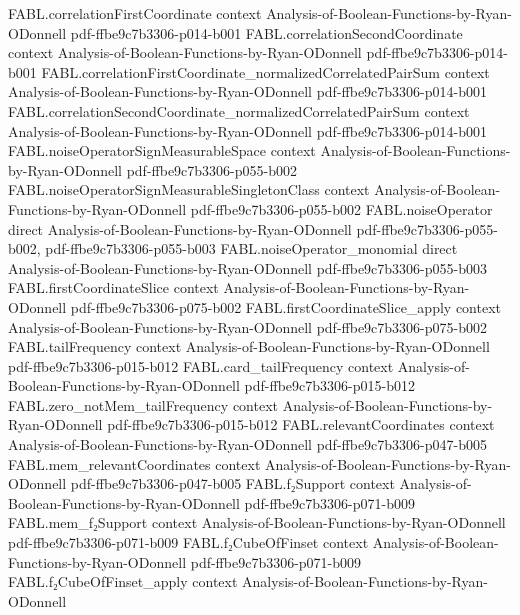 \begin{theorem}
  {FABL.correlationFirstCoordinate}
  {context}
  {Analysis-of-Boolean-Functions-by-Ryan-ODonnell}
  {pdf-ffbe9c7b3306-p014-b001}
\proofstep
  {FABL.correlationSecondCoordinate}
  {context}
  {Analysis-of-Boolean-Functions-by-Ryan-ODonnell}
  {pdf-ffbe9c7b3306-p014-b001}
\proofstep
  {FABL.correlationFirstCoordinate_normalizedCorrelatedPairSum}
  {context}
  {Analysis-of-Boolean-Functions-by-Ryan-ODonnell}
  {pdf-ffbe9c7b3306-p014-b001}
\proofstep
  {FABL.correlationSecondCoordinate_normalizedCorrelatedPairSum}
  {context}
  {Analysis-of-Boolean-Functions-by-Ryan-ODonnell}
  {pdf-ffbe9c7b3306-p014-b001}
\proofstep
  {FABL.noiseOperatorSignMeasurableSpace}
  {context}
  {Analysis-of-Boolean-Functions-by-Ryan-ODonnell}
  {pdf-ffbe9c7b3306-p055-b002}
\proofstep
  {FABL.noiseOperatorSignMeasurableSingletonClass}
  {context}
  {Analysis-of-Boolean-Functions-by-Ryan-ODonnell}
  {pdf-ffbe9c7b3306-p055-b002}
\proofstep
  {FABL.noiseOperator}
  {direct}
  {Analysis-of-Boolean-Functions-by-Ryan-ODonnell}
  {pdf-ffbe9c7b3306-p055-b002,
    pdf-ffbe9c7b3306-p055-b003}
\proofstep
  {FABL.noiseOperator_monomial}
  {direct}
  {Analysis-of-Boolean-Functions-by-Ryan-ODonnell}
  {pdf-ffbe9c7b3306-p055-b003}
\proofstep
  {FABL.firstCoordinateSlice}
  {context}
  {Analysis-of-Boolean-Functions-by-Ryan-ODonnell}
  {pdf-ffbe9c7b3306-p075-b002}
\proofstep
  {FABL.firstCoordinateSlice_apply}
  {context}
  {Analysis-of-Boolean-Functions-by-Ryan-ODonnell}
  {pdf-ffbe9c7b3306-p075-b002}
\proofstep
  {FABL.tailFrequency}
  {context}
  {Analysis-of-Boolean-Functions-by-Ryan-ODonnell}
  {pdf-ffbe9c7b3306-p015-b012}
\proofstep
  {FABL.card_tailFrequency}
  {context}
  {Analysis-of-Boolean-Functions-by-Ryan-ODonnell}
  {pdf-ffbe9c7b3306-p015-b012}
\proofstep
  {FABL.zero_notMem_tailFrequency}
  {context}
  {Analysis-of-Boolean-Functions-by-Ryan-ODonnell}
  {pdf-ffbe9c7b3306-p015-b012}
\proofstep
  {FABL.relevantCoordinates}
  {context}
  {Analysis-of-Boolean-Functions-by-Ryan-ODonnell}
  {pdf-ffbe9c7b3306-p047-b005}
\proofstep
  {FABL.mem_relevantCoordinates}
  {context}
  {Analysis-of-Boolean-Functions-by-Ryan-ODonnell}
  {pdf-ffbe9c7b3306-p047-b005}
\proofstep
  {FABL.f₂Support}
  {context}
  {Analysis-of-Boolean-Functions-by-Ryan-ODonnell}
  {pdf-ffbe9c7b3306-p071-b009}
\proofstep
  {FABL.mem_f₂Support}
  {context}
  {Analysis-of-Boolean-Functions-by-Ryan-ODonnell}
  {pdf-ffbe9c7b3306-p071-b009}
\proofstep
  {FABL.f₂CubeOfFinset}
  {context}
  {Analysis-of-Boolean-Functions-by-Ryan-ODonnell}
  {pdf-ffbe9c7b3306-p071-b009}
\proofstep
  {FABL.f₂CubeOfFinset_apply}
  {context}
  {Analysis-of-Boolean-Functions-by-Ryan-ODonnell}

\end{theorem}
